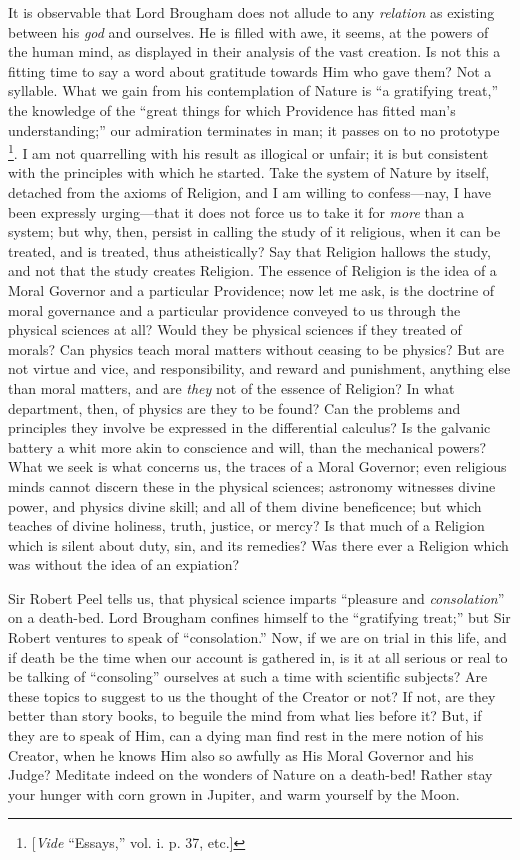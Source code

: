It is observable that Lord Brougham does not allude to any \emph{relation}
as existing between his \emph{god} and ourselves. He is filled with
awe, it seems, at the powers of the human mind, as displayed in their
analysis of the vast creation. Is not this a fitting time to say a
word about gratitude towards Him who gave them? Not a syllable. What
we gain from his contemplation of Nature is ``a gratifying
treat,'' the knowledge of the ``great things for which
Providence has fitted man's understanding;'' our admiration
terminates in man; it passes on to no prototype \footnote{[\emph{Vide} ``Essays,'' vol.
i. p.
37, etc.]}. I am not quarrelling with his result as illogical or unfair;
it is but consistent with the principles with which he started. Take
the system of Nature by itself, detached from the axioms of Religion,
and I am willing to confess—nay, I have been expressly urging—that
it does not force us to take it for \emph{more} than a system;
but why, then, persist in calling the study of it religious, when it
can be treated, and is treated, thus atheistically? Say that Religion
hallows the study, and not that the study creates Religion. The
essence of Religion is the idea of a Moral Governor and a particular
Providence; now let me ask, is the doctrine of moral governance and a
particular providence conveyed to us through the physical sciences at
all? Would they be physical sciences if they treated of morals? Can
physics teach moral matters without ceasing to be physics? But are not
virtue and vice, and responsibility, and reward and punishment,
anything else than moral matters, and are \emph{they} not of the
essence of Religion? In what department, then, of physics are they to
be found? Can the problems and principles they involve be expressed in
the differential calculus? Is the galvanic battery a whit more akin to
conscience and will, than the mechanical powers? What we seek is what
concerns us, the traces of a Moral Governor; even religious minds
cannot discern these in the physical sciences; astronomy witnesses
divine power, and physics divine skill; and all of them divine
beneficence; but which teaches of divine holiness, truth, justice, or
mercy? Is that much of a Religion which is silent about duty, sin, and
its remedies? Was there ever a Religion which was without the idea of
an expiation?

Sir Robert Peel tells us, that physical science imparts
``pleasure and \emph{consolation}'' on a death-bed. Lord
Brougham confines himself to the ``gratifying treat;'' but Sir
Robert ventures to speak of ``consolation.'' Now, if we are on
trial in this life, and if death be the time when our account is
gathered in, is it at all serious or real to be talking of
``consoling'' ourselves at such a time with scientific
subjects? Are these topics to suggest to us the thought of the Creator
or not? If not, are they better than story books, to beguile the mind
from what lies before it? But, if they are to speak of Him, can a
dying man find rest in the mere notion of his Creator, when he knows
Him also so awfully as His Moral Governor and his Judge? Meditate
indeed on the wonders of Nature on a death-bed! Rather stay your
hunger with corn grown in Jupiter, and warm yourself by the Moon.

